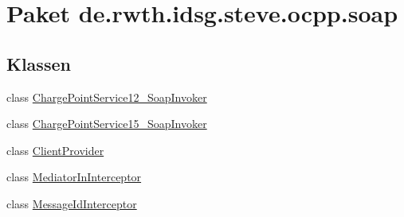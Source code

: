 \hypertarget{namespacede_1_1rwth_1_1idsg_1_1steve_1_1ocpp_1_1soap}{\section{Paket de.\+rwth.\+idsg.\+steve.\+ocpp.\+soap}
\label{namespacede_1_1rwth_1_1idsg_1_1steve_1_1ocpp_1_1soap}
}
\subsection*{Klassen}
\begin{DoxyCompactItemize}
\item 
class \hyperlink{classde_1_1rwth_1_1idsg_1_1steve_1_1ocpp_1_1soap_1_1_charge_point_service12___soap_invoker}{Charge\+Point\+Service12\+\_\+\+Soap\+Invoker}
\item 
class \hyperlink{classde_1_1rwth_1_1idsg_1_1steve_1_1ocpp_1_1soap_1_1_charge_point_service15___soap_invoker}{Charge\+Point\+Service15\+\_\+\+Soap\+Invoker}
\item 
class \hyperlink{classde_1_1rwth_1_1idsg_1_1steve_1_1ocpp_1_1soap_1_1_client_provider}{Client\+Provider}
\item 
class \hyperlink{classde_1_1rwth_1_1idsg_1_1steve_1_1ocpp_1_1soap_1_1_mediator_in_interceptor}{Mediator\+In\+Interceptor}
\item 
class \hyperlink{classde_1_1rwth_1_1idsg_1_1steve_1_1ocpp_1_1soap_1_1_message_id_interceptor}{Message\+Id\+Interceptor}
\end{DoxyCompactItemize}
